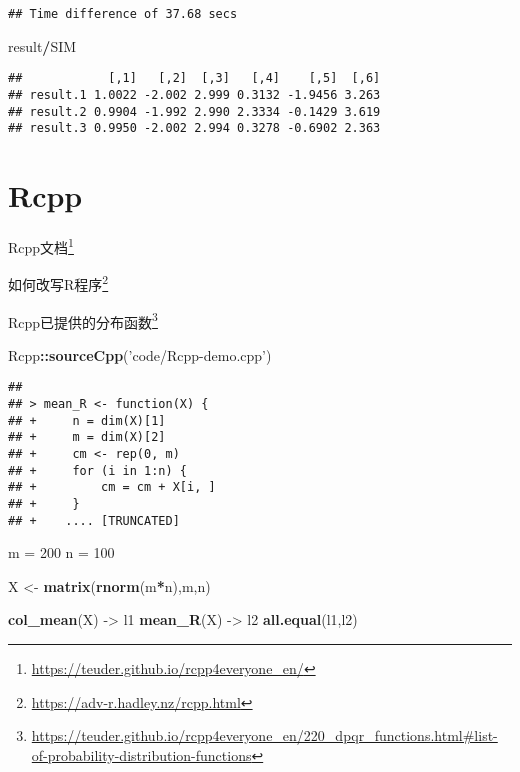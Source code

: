\documentclass[]{ctexbook}
\newenvironment{Shaded}{\begin{snugshade}}{\end{snugshade}}
\newcommand{\DecValTok}[1]{\textcolor[rgb]{0.00,0.00,0.81}{#1}}
\newcommand{\KeywordTok}[1]{\textcolor[rgb]{0.13,0.29,0.53}{\textbf{#1}}}
\newcommand{\NormalTok}[1]{#1}
\newcommand{\OperatorTok}[1]{\textcolor[rgb]{0.81,0.36,0.00}{\textbf{#1}}}
\newcommand{\StringTok}[1]{\textcolor[rgb]{0.31,0.60,0.02}{#1}}
\renewcommand{\href}[2]{#2\footnote{\url{#1}}}
\begin{document}
\begin{verbatim}
## Time difference of 37.68 secs
\end{verbatim}

\begin{Shaded}
\begin{Highlighting}[]
\NormalTok{result}\OperatorTok{/}\NormalTok{SIM}
\end{Highlighting}
\end{Shaded}

\begin{verbatim}
##            [,1]   [,2]  [,3]   [,4]    [,5]  [,6]
## result.1 1.0022 -2.002 2.999 0.3132 -1.9456 3.263
## result.2 0.9904 -1.992 2.990 2.3334 -0.1429 3.619
## result.3 0.9950 -2.002 2.994 0.3278 -0.6902 2.363
\end{verbatim}

\hypertarget{rcpp}{%
\section{Rcpp}\label{rcpp}}

\href{https://teuder.github.io/rcpp4everyone_en/}{Rcpp文档}

\href{https://adv-r.hadley.nz/rcpp.html}{如何改写R程序}

\href{https://teuder.github.io/rcpp4everyone_en/220_dpqr_functions.html\#list-of-probability-distribution-functions}{Rcpp已提供的分布函数}

\begin{Shaded}
\begin{Highlighting}[]
\NormalTok{Rcpp}\OperatorTok{::}\KeywordTok{sourceCpp}\NormalTok{(}\StringTok{'code/Rcpp-demo.cpp'}\NormalTok{)}
\end{Highlighting}
\end{Shaded}

\begin{verbatim}
## 
## > mean_R <- function(X) {
## +     n = dim(X)[1]
## +     m = dim(X)[2]
## +     cm <- rep(0, m)
## +     for (i in 1:n) {
## +         cm = cm + X[i, ]
## +     }
## +    .... [TRUNCATED]
\end{verbatim}

\begin{Shaded}
\begin{Highlighting}[]
\NormalTok{m =}\StringTok{ }\DecValTok{200}
\NormalTok{n =}\StringTok{ }\DecValTok{100}

\NormalTok{X <-}\StringTok{ }\KeywordTok{matrix}\NormalTok{(}\KeywordTok{rnorm}\NormalTok{(m}\OperatorTok{*}\NormalTok{n),m,n)}

\KeywordTok{col_mean}\NormalTok{(X) ->}\StringTok{ }\NormalTok{l1}
\KeywordTok{mean_R}\NormalTok{(X) ->}\StringTok{ }\NormalTok{l2}
\KeywordTok{all.equal}\NormalTok{(l1,l2)}
\end{Highlighting}
\end{Shaded}
\end{document}
